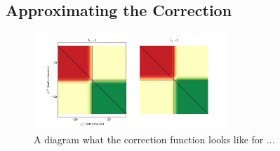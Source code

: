 
\subsection{Approximating the Correction}

\begin{figure}[h]
\begin{center}
  \includegraphics[width = 0.65\textwidth]{Assets/correction.png}
\caption{A diagram what the correction function looks like for ...}
\label{F:Correction-Plot}
\end{center}
\end{figure}

%
%
%
%
%
%
%
%
%
%
%
